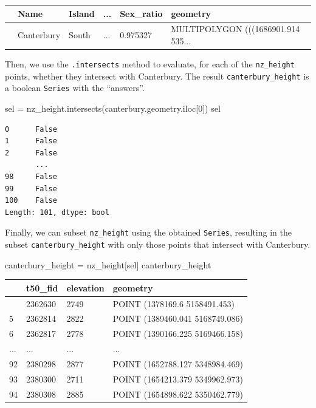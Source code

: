 \documentclass[
  letterpaper,
]{krantz}
\newenvironment{Shaded}{\begin{snugshade}}{\end{snugshade}}
\newcommand{\DecValTok}[1]{\textcolor[rgb]{0.68,0.00,0.00}{#1}}
\newcommand{\NormalTok}[1]{\textcolor[rgb]{0.00,0.23,0.31}{#1}}
\newcommand{\OperatorTok}[1]{\textcolor[rgb]{0.37,0.37,0.37}{#1}}
\begin{document}
\begin{longtable}[]{@{}llllll@{}}
\toprule\noalign{}
& Name & Island & ... & Sex\_ratio & geometry \\
\midrule\noalign{}
\endhead
\bottomrule\noalign{}
\endlastfoot
10 & Canterbury & South & ... & 0.975327 & MULTIPOLYGON (((1686901.914
535... \\
\end{longtable}

Then, we use the \texttt{.intersects} method to evaluate, for each of
the \texttt{nz\_height} points, whether they intersect with Canterbury.
The result \texttt{canterbury\_height} is a boolean \texttt{Series} with
the ``answers''.

\begin{Shaded}
\begin{Highlighting}[]
\NormalTok{sel }\OperatorTok{=}\NormalTok{ nz\_height.intersects(canterbury.geometry.iloc[}\DecValTok{0}\NormalTok{])}
\NormalTok{sel}
\end{Highlighting}
\end{Shaded}

\begin{verbatim}
0      False
1      False
2      False
       ...  
98     False
99     False
100    False
Length: 101, dtype: bool
\end{verbatim}

Finally, we can subset \texttt{nz\_height} using the obtained
\texttt{Series}, resulting in the subset \texttt{canterbury\_height}
with only those points that intersect with Canterbury.

\begin{Shaded}
\begin{Highlighting}[]
\NormalTok{canterbury\_height }\OperatorTok{=}\NormalTok{ nz\_height[sel]}
\NormalTok{canterbury\_height}
\end{Highlighting}
\end{Shaded}

\begin{longtable}[]{@{}llll@{}}
\toprule\noalign{}
& t50\_fid & elevation & geometry \\
\midrule\noalign{}
\endhead
\bottomrule\noalign{}
\endlastfoot
4 & 2362630 & 2749 & POINT (1378169.6 5158491.453) \\
5 & 2362814 & 2822 & POINT (1389460.041 5168749.086) \\
6 & 2362817 & 2778 & POINT (1390166.225 5169466.158) \\
... & ... & ... & ... \\
92 & 2380298 & 2877 & POINT (1652788.127 5348984.469) \\
93 & 2380300 & 2711 & POINT (1654213.379 5349962.973) \\
94 & 2380308 & 2885 & POINT (1654898.622 5350462.779) \\
\end{longtable}
\end{document}
